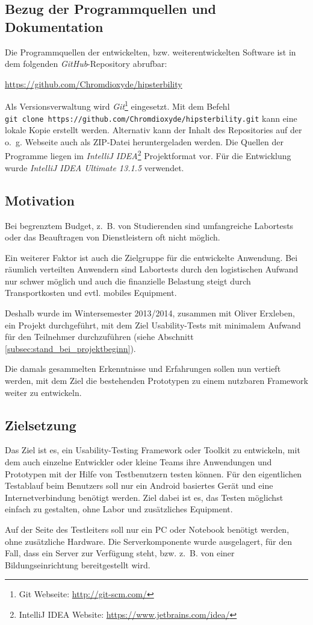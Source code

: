 \subsection{Bezug der Programmquellen und Dokumentation}
Die Programmquellen der entwickelten, bzw. weiterentwickelten Software ist in dem folgenden \emph{GitHub}-Repository abrufbar:
\begin{center}
	\url{https://github.com/Chromdioxyde/hipsterbility}
\end{center}
Als Versionsverwaltung wird \emph{Git}\footnote{Git Webseite: \url{http://git-scm.com/}} eingesetzt.
Mit dem Befehl
\\
 \texttt{git clone https://github.com/Chromdioxyde/hipsterbility.git} kann eine lokale Kopie erstellt werden.
Alternativ kann der Inhalt des Repositories auf der o.~g. Webseite auch als ZIP-Datei heruntergeladen werden.
Die Quellen der Programme liegen im \emph{IntelliJ IDEA}\footnote{IntelliJ IDEA Website: \url{https://www.jetbrains.com/idea/}} Projektformat vor.
Für die Entwicklung wurde \emph{IntelliJ IDEA Ultimate 13.1.5} verwendet.

\subsection{Motivation}
Bei begrenztem Budget, z.~B. von Studierenden sind umfangreiche Labortests oder das Beauftragen von Dienstleistern oft nicht möglich.

Ein weiterer Faktor ist auch die Zielgruppe für die entwickelte Anwendung.
Bei räumlich verteilten Anwendern sind Labortests durch den logistischen Aufwand nur schwer möglich und auch die finanzielle Belastung steigt durch Transportkosten und evtl. mobiles Equipment.

Deshalb wurde im Wintersemester 2013/2014, zusammen mit Oliver Erxleben, ein Projekt durchgeführt, mit dem Ziel Usability-Tests mit minimalem Aufwand für den Teilnehmer durchzuführen (siehe Abschnitt \ref{subsec:stand_bei_projektbeginn}).

Die damals gesammelten Erkenntnisse und Erfahrungen sollen nun vertieft werden, mit dem Ziel die bestehenden Prototypen zu einem nutzbaren Framework weiter zu entwickeln.


\subsection{Zielsetzung}
Das Ziel ist es, ein Usability-Testing Framework oder Toolkit zu entwickeln, mit dem auch einzelne Entwickler oder kleine Teams ihre Anwendungen und Prototypen mit der Hilfe von Testbenutzern testen können.
Für den eigentlichen Testablauf beim Benutzers soll nur ein Android basiertes Gerät und eine Internetverbindung benötigt werden.
Ziel dabei ist es, das Testen möglichst einfach zu gestalten, ohne Labor und zusätzliches Equipment.

Auf der Seite des Testleiters soll nur ein PC oder Notebook benötigt werden, ohne zusätzliche Hardware.
Die Serverkomponente wurde ausgelagert, für den Fall, dass ein Server zur Verfügung steht, bzw. z.~B. von einer Bildungseinrichtung bereitgestellt wird.